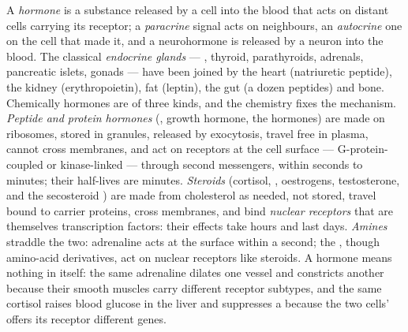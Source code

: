 \begin{definition}[Hormone]\label{def:b3:endocrinology:hormone}
A \emph{hormone} is a substance released by a cell into the blood
that acts on distant cells carrying its receptor; a \emph{paracrine}
signal acts on neighbours, an \emph{autocrine} one on the cell that
made it, and a neurohormone is released by a neuron into the blood.
The classical \emph{endocrine glands} --- , thyroid,
parathyroids, adrenals, pancreatic islets, gonads --- have been joined
by the heart (natriuretic peptide), the kidney (erythropoietin), fat
(leptin), the gut (a dozen peptides) and bone. Chemically hormones are
of three kinds, and the chemistry fixes the mechanism. \emph{Peptide
and protein hormones} (, growth hormone, the 
hormones) are made on ribosomes, stored in granules, released by
exocytosis, travel free in plasma, cannot cross membranes, and act on
receptors at the cell surface --- G-protein-coupled or kinase-linked ---
through second messengers, within seconds to minutes; their half-lives
are minutes. \emph{Steroids} (cortisol, , oestrogens,
testosterone, and the secosteroid ) are made from cholesterol
as needed, not stored, travel bound to carrier proteins, cross
membranes, and bind \emph{nuclear receptors} that are themselves
transcription factors: their effects take hours and last days.
\emph{Amines} straddle the two: adrenaline acts at the surface within a
second; the , though amino-acid derivatives, act on
nuclear receptors like steroids. A hormone means nothing in itself: the
same adrenaline dilates one vessel and constricts another because their
smooth muscles carry different receptor subtypes, and the same cortisol
raises blood glucose in the liver and suppresses a  because
the two cells'  offers its receptor different genes.
\end{definition}

